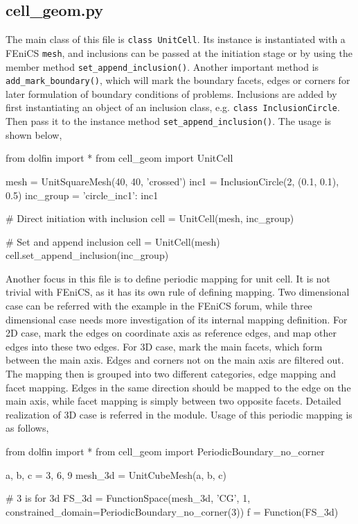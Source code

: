 \subsection{cell\_geom.py}
The main class of this file is \texttt{class UnitCell}. Its instance is instantiated with a FEniCS \texttt{mesh}, and inclusions can be passed at the initiation stage or by using the member method \texttt{set\_append\_inclusion()}. Another important method is \texttt{add\_mark\_boundary()}, which will mark the boundary facets, edges or corners for later formulation of boundary conditions of problems. Inclusions are added by first instantiating an object of an inclusion class, e.g. \texttt{class InclusionCircle}. Then pass it to the instance method \texttt{set\_append\_inclusion()}. The usage is shown below,

\begin{python}
from dolfin import *
from cell_geom import UnitCell

mesh = UnitSquareMesh(40, 40, 'crossed')
inc1 = InclusionCircle(2, (0.1, 0.1), 0.5)
inc_group = {'circle_inc1': inc1}

# Direct initiation with inclusion
cell = UnitCell(mesh, inc_group)

# Set and append inclusion
cell = UnitCell(mesh)
cell.set_append_inclusion(inc_group)
\end{python}

Another focus in this file is to define periodic mapping for unit cell. It is not trivial with FEniCS, as it has its own rule of defining mapping. Two dimensional case can be referred with the example in the FEniCS forum, while three dimensional case needs more investigation of its internal mapping definition. For 2D case, mark the edges on coordinate axis as reference edges, and map other edges into these two edges. For 3D case, mark the main facets, which form between the main axis. Edges and corners not on the main axis are filtered out. The mapping then is grouped into two different categories, edge mapping and facet mapping. Edges in the same direction should be mapped to the edge on the main axis, while facet mapping is simply between two opposite facets. Detailed realization of 3D case is referred in the module. Usage of this periodic mapping is as follows,

\begin{python}
from dolfin import *
from cell_geom import PeriodicBoundary_no_corner

a, b, c = 3, 6, 9
mesh_3d = UnitCubeMesh(a, b, c)

# 3 is for 3d
FS_3d = FunctionSpace(mesh_3d, 'CG', 1, constrained_domain=PeriodicBoundary_no_corner(3))
f = Function(FS_3d)
\end{python}

